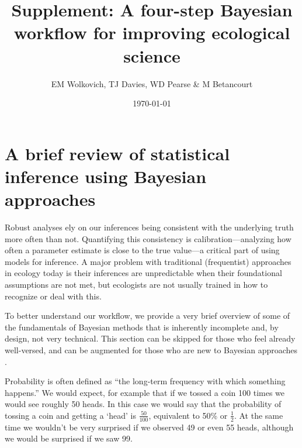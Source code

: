 \documentclass[11pt]{article}
\begin{document}


\renewcommand{\refname}{\CHead{}}

\title{Supplement: A four-step Bayesian workflow for improving ecological science}
\date{\today}
\author{EM Wolkovich, TJ Davies, WD Pearse \& M Betancourt}
\maketitle

\renewcommand{\thetable}{S\arabic{table}}
\renewcommand{\thefigure}{S\arabic{figure}}

\section*{A brief review of statistical inference using Bayesian approaches}

Robust analyses ely on our inferences being consistent with the underlying truth more often than not.  Quantifying this consistency is calibration---analyzing how often a parameter estimate is close to the true value---a critical part of using models for inference. A major problem with traditional (frequentist) approaches in ecology today is their inferences are unpredictable when their foundational assumptions are not met, but ecologists are not usually trained in how to recognize or deal with this.

To better understand our workflow, we provide a very brief overview of some of the fundamentals of Bayesian methods that is inherently incomplete and, by design, not very technical. This section can be skipped for those who feel already well-versed, and can be augmented for those who are new to Bayesian approaches \citep[for example,][]{statrethink,BDA,regotherstories}.

Probability is often defined as ``the long-term frequency with which something happens.'' We would expect, for example that if we tossed a coin 100 times we would see roughly 50 heads.  In this case we would say that the probability of tossing a coin and getting a `head' is $\frac{50}{100}$, equivalent to 50\% or $\frac{1}{2}$. At the same time we wouldn't be very surprised if we observed 49 or even 55 heads, although we would be surprised if we saw 99.
\end{document}
